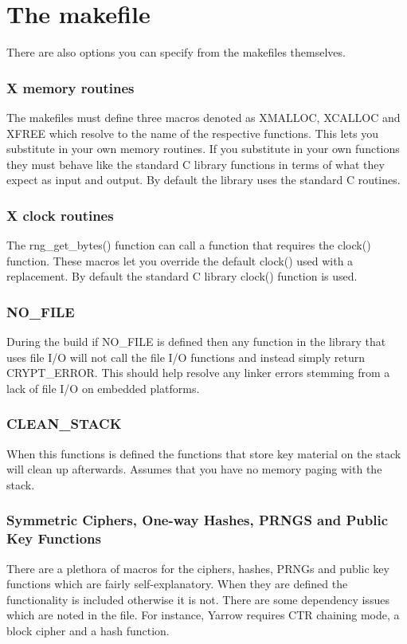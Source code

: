 \documentclass{book}
\begin{document}
\section{The makefile}
There are also options you can specify from the makefiles themselves.  

\subsubsection{X memory routines}
The makefiles must define three macros denoted as XMALLOC, XCALLOC and XFREE which resolve to the name of the respective
functions.  This lets you substitute in your own memory routines.  If you substitute in your own functions they must behave
like the standard C library functions in terms of what they expect as input and output.  By default the library uses the
standard C routines.

\subsubsection{X clock routines}
The rng\_get\_bytes() function can call a function that requires the clock() function.  These macros let you override
the default clock() used with a replacement.  By default the standard C library clock() function is used.

\subsubsection{NO\_FILE}
During the build if NO\_FILE is defined then any function in the library that uses file I/O will not call the file I/O 
functions and instead simply return CRYPT\_ERROR.  This should help resolve any linker errors stemming from a lack of
file I/O on embedded platforms.

\subsubsection{CLEAN\_STACK}
When this functions is defined the functions that store key material on the stack will clean up afterwards.  Assumes that
you have no memory paging with the stack.

\subsubsection{Symmetric Ciphers, One-way Hashes, PRNGS and Public Key Functions}
There are a plethora of macros for the ciphers, hashes, PRNGs and public key functions which are fairly self-explanatory.  
When they are defined the functionality is included otherwise it is not.  There are some dependency issues which are
noted in the file.  For instance, Yarrow requires CTR chaining mode, a block cipher and a hash function.
\end{document}
